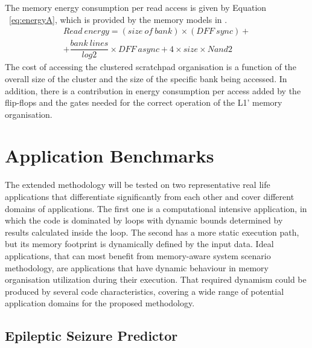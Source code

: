 The memory energy consumption per read access is given by Equation ~\ref{eq:energyA}, which is provided by the memory models in \cite{Artes2011}.    
\begin{multline}
Read \: energy = (size \: of \: bank) \times (DFF \: sync)+ \\ + \dfrac{bank \: lines}{log2} \times DFF \: async + 4 \times size \times Nand2 
\label{eq:energyA}
\end{multline}
The cost of accessing the clustered scratchpad organisation is a function of the overall size of the cluster and the size of the specific bank being accessed. In addition, there is a contribution in energy consumption per access added by the flip-flops and the gates needed for the correct operation of the L1' memory organisation.
 
\section{Application Benchmarks}
\label{sec:applications}

The extended methodology will be tested on two representative real life applications that differentiate significantly from each other and cover different domains of applications. The first one is a computational intensive application, in which the code is dominated by loops with dynamic bounds determined by results calculated inside the loop. The second has a more static execution path, but its memory footprint is dynamically defined by the input data. Ideal applications, that can most benefit from memory-aware system scenario methodology, are applications that have dynamic behaviour in memory organisation utilization during their execution. That required dynamism could be produced by several code characteristics, covering a wide range of potential application domains for the proposed methodology.

\subsection{Epileptic Seizure Predictor}

